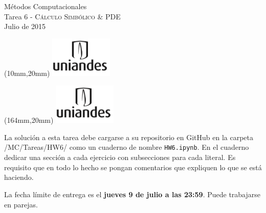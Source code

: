 \documentclass[11pt,legalpaper]{exam}
\begin{document}
\begin{center}
{\Large Métodos Computacionales} \\
Tarea 6 - \textsc{Cálculo Simbólico \& PDE } \\
Julio de 2015
\end{center}

\begin{textblock*}{40mm}(10mm,20mm)
  \includegraphics[width=3cm]{logoUniandes.png}
\end{textblock*}

\begin{textblock*}{40mm}(164mm,20mm)
  \includegraphics[width=3cm]{logoUniandes.png}
\end{textblock*}

\vspace{0.5cm}

La solución a esta tarea debe cargarse a su repositorio en GitHub en la carpeta /MC/Tareas/HW6/ como un  cuaderno de nombre \verb+HW6.ipynb+. En el cuaderno dedicar una sección a cada ejercicio con subsecciones para cada literal. Es requisito que en todo lo hecho se pongan comentarios que expliquen lo que se está haciendo.  

La fecha límite de entrega es el \textbf{jueves 9 de julio a las 23:59}. Puede trabajarse en parejas.

\vspace{0.5cm}
\end{document}
